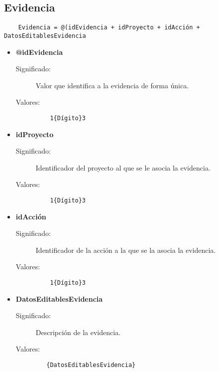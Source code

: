 \subsection{Evidencia}
\label{dd:Evidencia}
\begin{lstlisting}
    Evidencia = @(idEvidencia + idProyecto + idAcción + DatosEditablesEvidencia
\end{lstlisting}
 \begin{itemize}

    \item \textbf{@idEvidencia}
      \begin{description}
        \item [Significado:] Valor que identifica a la evidencia de forma única.
        \item [Valores:]{\begin{lstlisting}
	1{Dígito}3\end{lstlisting}}\end{description}

    \item \textbf{idProyecto}
      \begin{description}
        \item [Significado:] Identificador del proyecto al que se le asocia la evidencia.
        \item [Valores:]{\begin{lstlisting}
	1{Dígito}3
\end{lstlisting}}\end{description}
 
\item \textbf{idAcción}
      \begin{description}
        \item [Significado:] Identificador de la acción a la que se la asocia la evidencia.
        \item [Valores:]{\begin{lstlisting}
	1{Dígito}3
\end{lstlisting}}\end{description}

    \item \textbf{DatosEditablesEvidencia}
      \begin{description}
        \item [Significado:] Descripción de la evidencia.
        \item [Valores:]{\begin{lstlisting}
   {DatosEditablesEvidencia}
\end{lstlisting}}\end{description}

\end{itemize}

